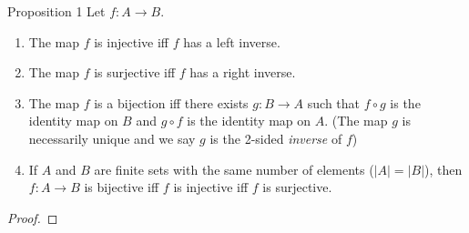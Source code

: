 \begin{namedthm*}{Proposition 1}
    Let $f:A\to B$.
    \begin{enumerate}[(1)]
        \item The map $f$ is injective iff $f$ has a left inverse.
        \item The map $f$ is surjective iff $f$ has a right inverse.
        \item The map $f$ is a bijection iff there exists $g:B\to A$ such that $f\circ g$ is the identity map on $B$ and $g\circ f$ is the identity map on $A$.
        (The map $g$ is necessarily unique and we say $g$ is the 2-sided \textit{inverse} of $f$)
        \item If $A$ and $B$ are finite sets with the same number of elements ($|A|=|B|$), then $f:A\to B$ is bijective iff $f$ is injective iff $f$ is surjective.
    \end{enumerate}
    \begin{proof}
    

\end{proof}
\end{namedthm*}
